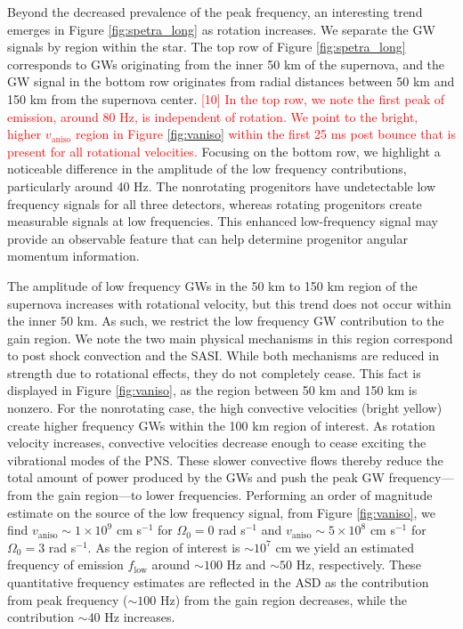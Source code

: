 \documentclass[twocolumn,times]{aastex62}  %
\begin{document}
Beyond the decreased prevalence of the peak frequency, an interesting trend emerges in Figure \ref{fig:spetra_long} as rotation increases.  
We separate the GW signals by region within the star.  The top row of Figure \ref{fig:spetra_long} corresponds to GWs originating from the inner 50 km of the supernova, and the GW signal in the bottom row originates from radial distances between 50 km and 150 km from the supernova center.  \textcolor{red}{[10]  In the top row, we note the first peak of emission, around 80 Hz, is independent of rotation.  We point to the bright, higher $v_\mathrm{aniso}$ region in Figure \ref{fig:vaniso} within the first 25 ms post bounce that is present for all rotational velocities.}
Focusing on the bottom row, we highlight a noticeable difference in the amplitude of the low frequency contributions, particularly around 40 Hz.  The nonrotating progenitors have undetectable low frequency signals for all three detectors, whereas rotating progenitors create measurable signals at low frequencies. 
This enhanced low-frequency signal may provide an observable feature that can help determine progenitor angular momentum information.  

The amplitude of low frequency GWs in the 50 km to 150 km region of the supernova increases with rotational velocity, but this trend does not occur within the inner 50 km.  As such, we restrict the low frequency GW contribution to the gain region.  We note the two main physical mechanisms in this region correspond to post shock convection and the SASI.  While both mechanisms are reduced in strength due to rotational effects, they do not completely cease.  This fact is displayed in Figure \ref{fig:vaniso}, as the region between 50 km and 150 km is nonzero.  For the nonrotating case, the high convective velocities (bright yellow) create higher frequency GWs within the 100 km region of interest.  As rotation velocity increases, convective velocities decrease enough to cease exciting the vibrational modes of the PNS.  These slower convective flows thereby reduce the total amount of power produced by the GWs and push the peak GW frequency---from the gain region---to lower frequencies.  Performing an order of magnitude estimate on the source of the low frequency signal, from Figure \ref{fig:vaniso}, we find  $v_{\mathrm{aniso}} \sim 1 \times 10^9$ cm s$^{-1}$ for $\Omega_0 = 0$ rad s$^{-1}$ and $v_{\mathrm{aniso}} \sim 5 \times 10^8$ cm s$^{-1}$ for $\Omega_0 = 3$ rad s$^{-1}$.  As the region of interest is $\sim 10^7$ cm we yield an estimated frequency of emission $f_{\mathrm{low}}$ around $\sim 100$ Hz and $\sim 50$ Hz, respectively.  These quantitative frequency estimates are reflected in the ASD as the contribution from peak frequency ($\sim 100$ Hz) from the gain region decreases, while the contribution $\sim 40$ Hz increases.
\end{document}

